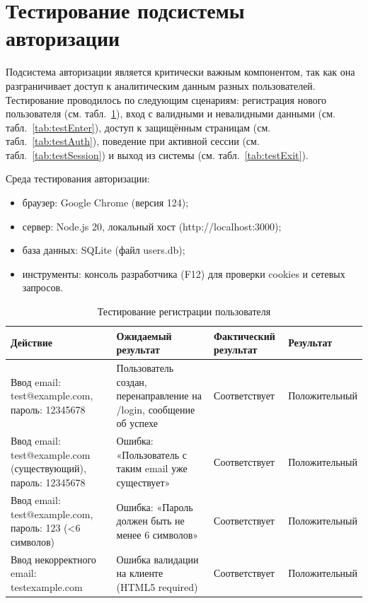 \section{Тестирование подсистемы авторизации}

Подсистема авторизации является критически важным компонентом, так как она разграничивает доступ к аналитическим данным разных пользователей. Тестирование проводилось по следующим сценариям: регистрация нового пользователя (см. табл.~\ref{tab:testReg}), вход с валидными и невалидными данными (см. табл.~\ref{tab:testEnter}), доступ к защищённым страницам (см. табл.~\ref{tab:testAuth}), поведение при активной сессии (см. табл.~\ref{tab:testSession}) и выход из системы (см. табл.~\ref{tab:testExit}).

Среда тестирования авторизации:
\begin{itemize}
\item браузер: Google Chrome (версия 124);
\item сервер: Node.js 20, локальный хост (http://localhost:3000);
\item база данных: SQLite (файл users.db);
\item инструменты: консоль разработчика (F12) для проверки cookies и сетевых запросов.
\end{itemize}

\begin{table}[H]
\caption{\label{tab:testReg}Тестирование регистрации пользователя}
\small
\begin{tabular}{|p{4cm}|p{4cm}|p{3cm}|p{4cm}|}
\hline
Действие & Ожидаемый результат & Фактический результат & Результат \\ \hline
Ввод email: test@example.com, пароль: 12345678 & Пользователь создан, перенаправление на /login, сообщение об успехе & Соответствует & Положительный \\ \hline
Ввод email: test@example.com (существующий), пароль: 12345678 & Ошибка: «Пользователь с таким email уже существует» & Соответствует & Положительный \\ \hline
Ввод email: test@example.com, пароль: 123 (<6 символов) & Ошибка: «Пароль должен быть не менее 6 символов» & Соответствует & Положительный \\ \hline
Ввод некорректного email: testexample.com & Ошибка валидации на клиенте (HTML5 required) & Соответствует & Положительный \\ \hline
\end{tabular}
\end{table}

